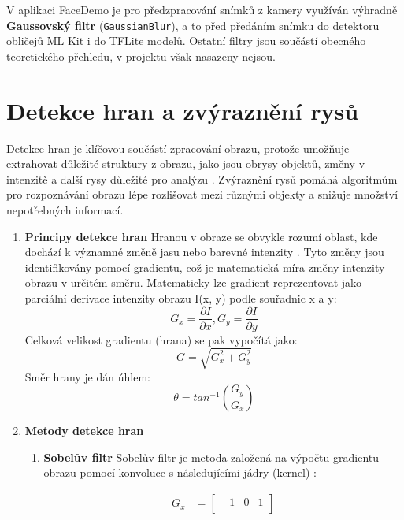 \documentclass[FM,BP,CZ]{tulthesis}
\begin{document}
V aplikaci FaceDemo je pro předzpracování snímků z kamery využíván výhradně \textbf{Gaussovský filtr} (\texttt{GaussianBlur}), a to před předáním snímku do detektoru obličejů ML Kit i do TFLite modelů. Ostatní filtry jsou součástí obecného teoretického přehledu, v projektu však nasazeny nejsou.
\section{Detekce hran a zvýraznění rysů}
Detekce hran je klíčovou součástí zpracování obrazu, protože umožňuje extrahovat důležité struktury z obrazu, jako jsou obrysy objektů, změny v intenzitě a další rysy důležité pro analýzu \cite{gonzalez2018digital}. Zvýraznění rysů pomáhá algoritmům pro rozpoznávání obrazu lépe rozlišovat mezi různými objekty a snižuje množství nepotřebných informací.
\begin{enumerate}
    \item \textbf{Principy detekce hran}
    \newline Hranou v obraze se obvykle rozumí oblast, kde dochází k významné změně jasu nebo barevné intenzity \cite{gonzalez2018digital}. Tyto změny jsou identifikovány pomocí gradientu, což je matematická míra změny intenzity obrazu v určitém směru.
    Matematicky lze gradient reprezentovat jako parciální derivace intenzity obrazu I(x, y) podle souřadnic x a y: 
    \begin{equation}
        G_x = \frac{∂I}{∂x}, G_y= \frac{∂I}{∂y} 
    \end{equation}
    Celková velikost gradientu (hrana) se pak vypočítá jako:
    \begin{equation}
        G = \sqrt{G_x^2 + G_y^2}
    \end{equation}
    Směr hrany je dán úhlem:
    \begin{equation}
        \theta = tan^{-1}(\frac{G_y}{G_x})
    \end{equation}
    \item \textbf{Metody detekce hran}
    \begin{enumerate}
        \item \textbf{Sobelův filtr}
        \newline Sobelův filtr je metoda založená na výpočtu gradientu obrazu pomocí konvoluce s následujícími jádry (kernel) \cite{gonzalez2018digital}:
\noindent
\begin{minipage}{0.48\linewidth}
\begin{align}
G_x &= \begin{bmatrix}
-1 & 0 & 1 \\

\end{bmatrix}
\end{align}
\end{minipage}
\end{enumerate}
\end{enumerate}
\end{document}
